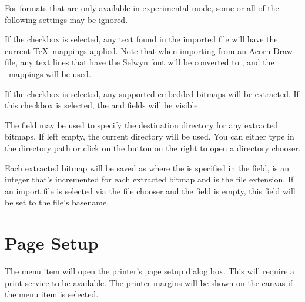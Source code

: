 \begin{information}
For formats that are only available in experimental mode,
some or all of the following settings may be ignored.
\end{information}


If the  checkbox is selected, any text
found in the imported file will have the current
\hyperref[mi:texmappings]{\TeX\ mappings}
applied. Note that when importing from an Acorn Draw file, any text
lines that have the Selwyn font will be converted to \mathsmode, 
and the \mathsmode\ mappings will be used.


If the  checkbox is selected,
any supported embedded \glspl{bitmap} will be extracted. If this checkbox
is selected, the  and
 fields will be visible.


The  field may be used to specify the
destination directory for any extracted \glspl{bitmap}. If left
empty, the current directory will be used. You can either type in
the directory path or click on the 
button on the right to open a directory chooser.


Each extracted \gls{bitmap} will be saved as
 where
the  is specified in the 
field,  is an integer that's incremented for each extracted
\gls{bitmap} and  is the file extension.
If an import file is selected via the file chooser and the
 field is empty, this field will be set to the
file's basename.

\section{Page Setup}\label{sec:pagesetup}


The  menu item will open the printer's page
setup dialog box. This will require a print service to be available.
The \glspl{printer-margin} will be shown on the \gls{canvas} if the
 menu item is selected.

